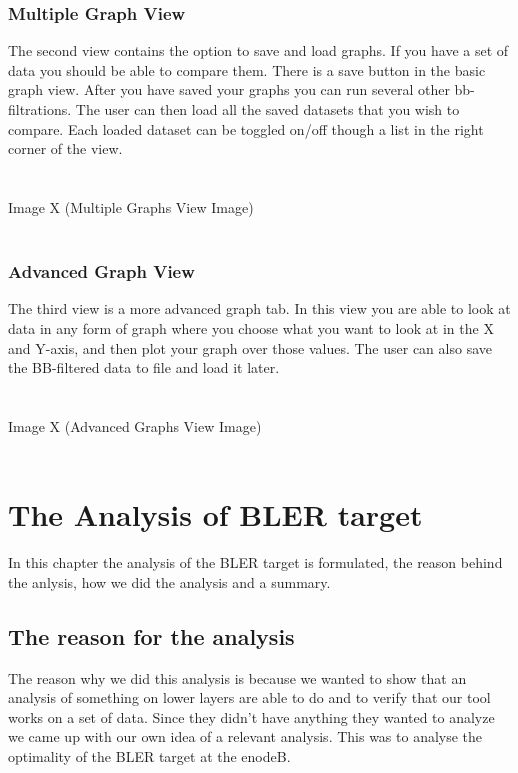 \documentclass[cropmarks, frame, english]{idamasterthesis}
\begin{document}
\subsection{Multiple Graph View}
The second view contains the option to save and load graphs. If you have a set of data you should be able to compare them. There is a save button in the basic graph view. After you have saved your graphs you can run several other bb-filtrations. The user can then load all the saved datasets that you wish to compare. Each loaded dataset can be toggled on/off though a list in the right corner of the view.
\\
\\
\\
       Image X (Multiple Graphs View Image)
\\
\\

\subsection{Advanced Graph View}
The third view is a more advanced graph tab. In this view you are able to look at data in any form of graph where you choose what you want to look at in the X and Y-axis, and then plot your graph over those values. The user can also save the BB-filtered data to file and load it later.
\\
\\
\\
       Image X (Advanced Graphs View Image)
\\
\\





















\chapter{The Analysis of BLER target}
In this chapter the analysis of the BLER target is formulated, the reason behind the anlysis, how we did the analysis and a summary.

\section{The reason for the analysis}
The reason why we did this analysis is because we wanted to show that an analysis of something on lower layers are able to do and to verify that our tool works on a set of data. Since they didn't have anything they wanted to analyze we came up with our own idea of a relevant analysis. This was to analyse the optimality of the BLER target at the enodeB.
\end{document}
